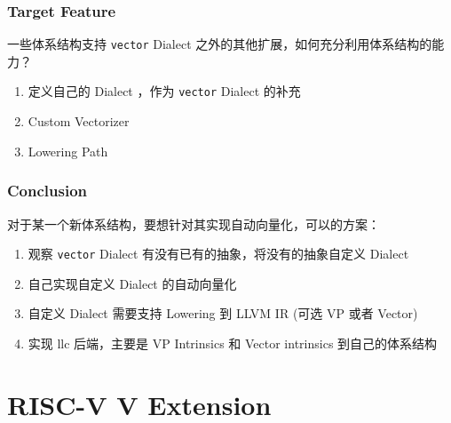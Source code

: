 \documentclass[aspectratio=169]{ctexbeamer}
\begin{document}
\begin{frame}
    \frametitle{Target Feature}

    一些体系结构支持 \texttt{vector} Dialect 之外的其他扩展，如何充分利用体系结构的能力？

    \vspace{1.5em}

    \begin{enumerate}
        \item 定义自己的 Dialect ，作为 \texttt{vector} Dialect 的补充
        \item Custom Vectorizer
        \item Lowering Path
    \end{enumerate}

\end{frame}


\begin{frame}
    \frametitle{Conclusion}

    对于某一个新体系结构，要想针对其实现自动向量化，可以的方案：

    \begin{enumerate}
        \item 观察 \texttt{vector} Dialect 有没有已有的抽象，将没有的抽象自定义 Dialect
        \item 自己实现自定义 Dialect 的自动向量化
        \item 自定义 Dialect 需要支持 Lowering 到 LLVM IR (可选 VP 或者 Vector)
        \item 实现 llc 后端，主要是 VP Intrinsics 和 Vector intrinsics 到自己的体系结构
    \end{enumerate}

\end{frame}

\section{RISC-V V Extension}
\end{document}
